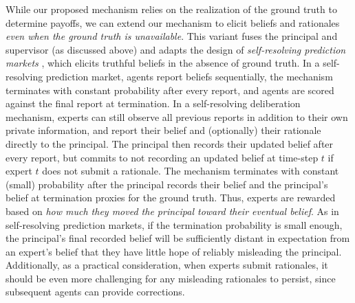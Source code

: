 \documentclass{winnower}
\begin{document}
While our proposed mechanism relies on the realization of the ground truth to determine payoffs, we can extend our mechanism to elicit beliefs and rationales \emph{even when the ground truth is unavailable}. This variant fuses the principal and supervisor (as discussed above) and adapts the design of \emph{self-resolving prediction markets} \citep{srinivasan2023selfresolving}, which elicits truthful beliefs in the absence of ground truth. In a self-resolving prediction market, agents report beliefs sequentially, the mechanism terminates with constant probability after every report, and agents are scored against the final report at termination. In a self-resolving deliberation mechanism, experts can still observe all previous reports in addition to their own private information, and report their belief and (optionally) their rationale directly to the principal. The principal then records their updated belief after every report, but commits to not recording an updated belief at time-step $t$ if expert $t$ does not submit a rationale. The mechanism terminates with constant (small) probability after the principal records their belief and the principal's belief at termination proxies for the ground truth. Thus, experts are rewarded based on \emph{how much they moved the principal toward their eventual belief}. As in self-resolving prediction markets, if the termination probability is small enough, the principal's final recorded belief will be sufficiently distant in expectation from an expert's belief that they have little hope of reliably misleading the principal. Additionally, as a practical consideration, when experts submit rationales, it should be even more challenging for any misleading rationales to persist, since subsequent agents can provide corrections.
\end{document}
